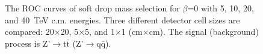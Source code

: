 \begin{figure}
\begin{center}
{ }
\end{center}
\caption{
The ROC curves of soft drop mass selection for $\beta$=0 
with 5, 10, 20, and 40~TeV c.m. energies. 
Three different detector cell sizes are compared: 20$\times$20, 
5$\times$5, and 1$\times$1 (cm$\times$cm). 
The signal (background) process is Z'$\rightarrow$t$\bar{\mathrm{t}}$
(Z'$\rightarrow$q$\bar{\mathrm{q}}$).
}
\label{fig:cluster_mass_mmdt_tt_ROC}
\end{figure}



